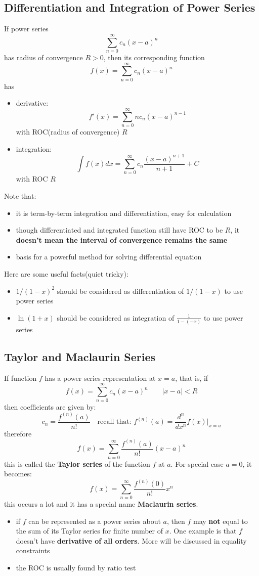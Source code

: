 \documentclass[10pt,a4paper,oneside]{article}
\begin{document}
\subsection{Differentiation and Integration of Power Series}
If power series 
\[
\sum_{n=0}^{\infty} c_n (x-a)^n
\]
has radius of convergence $R>0$, then its corresponding function
\[
f(x) = \sum_{n=0}^{\infty} c_n (x-a)^n
\]
has
\begin{itemize}
	\item derivative:
	\[
	f'(x) = \sum_{n=0}^{\infty} n c_n (x-a)^{n-1}
	\]
	with ROC(radius of convergence) $R$
	\item integration:
	\[
	\int f(x) dx = \sum_{n=0}^{\infty} c_n \frac{(x-a)^{n+1}}{n+1} + C
	\]
	with ROC $R$
\end{itemize}
Note that:
\begin{itemize}
	\item it is term-by-term integration and differentiation, easy for calculation
	\item though differentiated and integrated function still have ROC to be $R$, it \textbf{doesn't mean the interval of convergence remains the same}
	\item basis for a powerful method for solving differential equation
\end{itemize}
Here are some useful facts(quiet tricky):
\begin{itemize}
	\item $1/(1-x)^2$ should be considered as differentiation of $1/(1-x)$ to use power series
	\item $\ln (1+x) $ should be considered as integration of $\frac{1}{1-(-x)}$ to use power series
\end{itemize}

\subsection{Taylor and Maclaurin Series}
If function $f$ has a power series representation at $x=a$, that is, if
\[
f(x) = \sum_{n=0}^{\infty} c_n (x-a)^n \qquad |x-a|<R
\]
then coefficients are given by:
\[
c_n =  \frac{f^{(n)}(a)}{n!} \quad \text{recall that: } f^{(n)}(a) = \frac{d^n}{dx^n} f(x) | _{x=a}
\]
therefore
\[
f(x) = \sum_{n=0}^{\infty}  \frac{f^{(n)}(a)}{n!} (x-a)^n
\]
this is called the \textbf{Taylor series} of the function $f$ at $a$.  For special case $a=0$, it becomes:
\[
f(x) = \sum_{n=0}^{\infty}  \frac{f^{(n)}(0)}{n!} x^n
\]
this occurs a lot and it has a special name \textbf{Maclaurin series}. 
\begin{itemize}
	\item  if $f$ can be represented as a power series about $a$, then $f$ may \textbf{not} equal to the sum of its Taylor series for finite number of $x$. One example is that $f$ doesn't have \textbf{derivative of all orders}. More will be discussed in equality constraints
	\item  the ROC is usually found by ratio test
\end{itemize}
\end{document}
